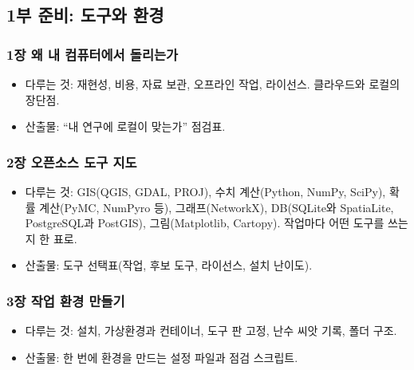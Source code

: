 \hypertarget{uxbd80-uxc900uxbe44-uxb3c4uxad6cuxc640-uxd658uxacbd}{%
\subsection{1부 준비: 도구와 환경}\label{uxbd80-uxc900uxbe44-uxb3c4uxad6cuxc640-uxd658uxacbd}}

\hypertarget{uxc7a5-uxc65c-uxb0b4-uxcef4uxd4e8uxd130uxc5d0uxc11c-uxb3ccuxb9acuxb294uxac00}{%
\subsubsection{1장 왜 내 컴퓨터에서 돌리는가}\label{uxc7a5-uxc65c-uxb0b4-uxcef4uxd4e8uxd130uxc5d0uxc11c-uxb3ccuxb9acuxb294uxac00}}

\begin{itemize}
\tightlist
\item
  다루는 것: 재현성, 비용, 자료 보관, 오프라인 작업, 라이선스. 클라우드와 로컬의 장단점.
\item
  산출물: ``내 연구에 로컬이 맞는가'' 점검표.
\end{itemize}

\hypertarget{uxc7a5-uxc624uxd508uxc18cuxc2a4-uxb3c4uxad6c-uxc9c0uxb3c4}{%
\subsubsection{2장 오픈소스 도구 지도}\label{uxc7a5-uxc624uxd508uxc18cuxc2a4-uxb3c4uxad6c-uxc9c0uxb3c4}}

\begin{itemize}
\tightlist
\item
  다루는 것: GIS(QGIS, GDAL, PROJ), 수치 계산(Python, NumPy, SciPy), 확률 계산(PyMC, NumPyro 등), 그래프(NetworkX), DB(SQLite와 SpatiaLite, PostgreSQL과 PostGIS), 그림(Matplotlib, Cartopy). 작업마다 어떤 도구를 쓰는지 한 표로.
\item
  산출물: 도구 선택표(작업, 후보 도구, 라이선스, 설치 난이도).
\end{itemize}

\hypertarget{uxc7a5-uxc791uxc5c5-uxd658uxacbd-uxb9ccuxb4e4uxae30}{%
\subsubsection{3장 작업 환경 만들기}\label{uxc7a5-uxc791uxc5c5-uxd658uxacbd-uxb9ccuxb4e4uxae30}}

\begin{itemize}
\tightlist
\item
  다루는 것: 설치, 가상환경과 컨테이너, 도구 판 고정, 난수 씨앗 기록, 폴더 구조.
\item
  산출물: 한 번에 환경을 만드는 설정 파일과 점검 스크립트.
\end{itemize}

